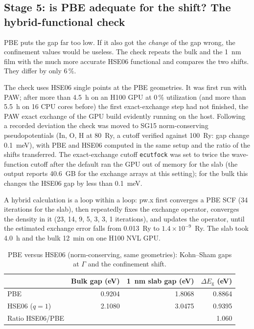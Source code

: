 \subsection{Stage 5: is PBE adequate for the shift? The hybrid-functional check}
\label{sec:dft-hse}

\begin{dftplain}
PBE puts the gap far too low. If it also got the \emph{change} of the gap wrong, the confinement values would be
useless. The check repeats the bulk and the 1~nm film with the much more accurate HSE06 functional and compares the two
shifts. They differ by only 6\,\%.
\end{dftplain}

The check uses HSE06 single points at the PBE geometries. It was first run with PAW; after more than 4.5~h on an H100
GPU at 0\,\% utilization (and more than 5.5~h on 16 CPU cores before) the first exact-exchange step had not finished,
the PAW exact exchange of the GPU build evidently running on the host. Following a recorded deviation the check was
moved to SG15 norm-conserving pseudopotentials \citep{Hamann2013,Schlipf2015} (In, O, H at 80~Ry, a cutoff verified
against 100~Ry: gap change 0.1~meV), with PBE and HSE06 computed in the same setup and the ratio of the shifts
transferred. The exact-exchange cutoff \texttt{ecutfock} was set to twice the wave-function cutoff after the default ran
the GPU out of memory for the slab (the output reports 40.6~GB for the exchange arrays at this setting); for the bulk
this changes the HSE06 gap by less than 0.1~meV.

A hybrid calculation is a loop within a loop: pw.x first converges a PBE SCF (34 iterations for the slab), then
repeatedly fixes the exchange operator, converges the density in it (23, 14, 9, 5, 3, 3, 1 iterations), and updates the
operator, until the estimated exchange error falls from 0.013~Ry to $1.4\times10^{-9}$~Ry. The slab took 4.0~h and the
bulk 12~min on one H100 NVL GPU.

\begin{table}[htbp]\centering\small
\caption{PBE versus HSE06 (norm-conserving, same geometries): Kohn--Sham gaps at $\Gamma$ and the confinement shift.}
\label{tab:dft-hse}
\begin{tabular}{lrrr}
\toprule
 & Bulk gap (eV) & 1~nm slab gap (eV) & $\Delta E_{\mathrm{g}}$ (eV) \\
\midrule
PBE & 0.9204 & 1.8068 & 0.8864 \\
HSE06 ($q = 1$) & 2.1080 & 3.0475 & 0.9395 \\
\midrule
Ratio HSE06/PBE & & & 1.060 \\
\bottomrule
\end{tabular}
\end{table}

